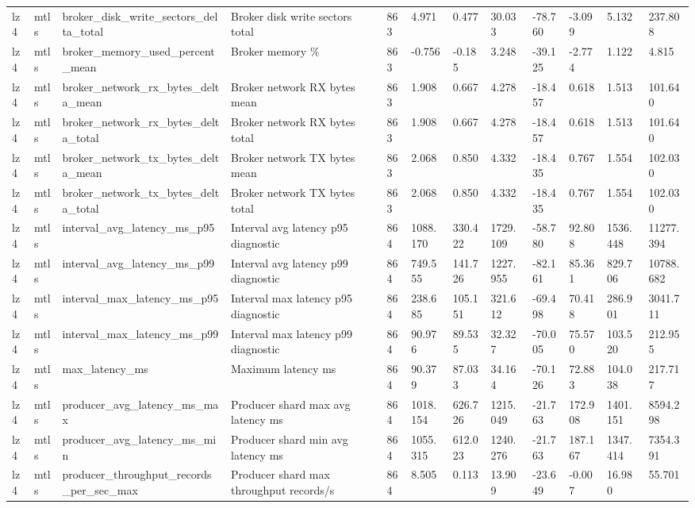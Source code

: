 \begin{longtable}{llllllllllll}
lz4 & mtls & broker\_disk\_write\_sectors\_delta\_total & Broker disk write sectors total & 863 & 4.971 & 0.477 & 30.033 & -78.760 & -3.099 & 5.132 & 237.808 \\
lz4 & mtls & broker\_memory\_used\_percent\_mean & Broker memory \% & 863 & -0.756 & -0.185 & 3.248 & -39.125 & -2.774 & 1.122 & 4.815 \\
lz4 & mtls & broker\_network\_rx\_bytes\_delta\_mean & Broker network RX bytes mean & 863 & 1.908 & 0.667 & 4.278 & -18.457 & 0.618 & 1.513 & 101.640 \\
lz4 & mtls & broker\_network\_rx\_bytes\_delta\_total & Broker network RX bytes total & 863 & 1.908 & 0.667 & 4.278 & -18.457 & 0.618 & 1.513 & 101.640 \\
lz4 & mtls & broker\_network\_tx\_bytes\_delta\_mean & Broker network TX bytes mean & 863 & 2.068 & 0.850 & 4.332 & -18.435 & 0.767 & 1.554 & 102.030 \\
lz4 & mtls & broker\_network\_tx\_bytes\_delta\_total & Broker network TX bytes total & 863 & 2.068 & 0.850 & 4.332 & -18.435 & 0.767 & 1.554 & 102.030 \\
lz4 & mtls & interval\_avg\_latency\_ms\_p95 & Interval avg latency p95 diagnostic & 864 & 1088.170 & 330.422 & 1729.109 & -58.780 & 92.808 & 1536.448 & 11277.394 \\
lz4 & mtls & interval\_avg\_latency\_ms\_p99 & Interval avg latency p99 diagnostic & 864 & 749.555 & 141.726 & 1227.955 & -82.161 & 85.361 & 829.706 & 10788.682 \\
lz4 & mtls & interval\_max\_latency\_ms\_p95 & Interval max latency p95 diagnostic & 864 & 238.685 & 105.151 & 321.612 & -69.498 & 70.418 & 286.901 & 3041.711 \\
lz4 & mtls & interval\_max\_latency\_ms\_p99 & Interval max latency p99 diagnostic & 864 & 90.976 & 89.535 & 32.327 & -70.005 & 75.570 & 103.520 & 212.955 \\
lz4 & mtls & max\_latency\_ms & Maximum latency ms & 864 & 90.379 & 87.033 & 34.164 & -70.126 & 72.883 & 104.038 & 217.717 \\
lz4 & mtls & producer\_avg\_latency\_ms\_max & Producer shard max avg latency ms & 864 & 1018.154 & 626.726 & 1215.049 & -21.763 & 172.908 & 1401.151 & 8594.298 \\
lz4 & mtls & producer\_avg\_latency\_ms\_min & Producer shard min avg latency ms & 864 & 1055.315 & 612.023 & 1240.276 & -21.763 & 187.167 & 1347.414 & 7354.391 \\
lz4 & mtls & producer\_throughput\_records\_per\_sec\_max & Producer shard max throughput records/s & 864 & 8.505 & 0.113 & 13.909 & -23.649 & -0.007 & 16.980 & 55.701 \\

\end{longtable}
